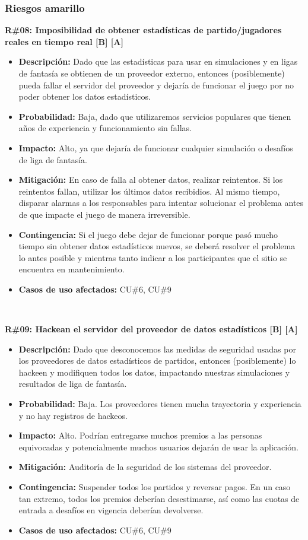 \subsubsection{Riesgos amarillo}

\noindent\textbf{R\#08: Imposibilidad de obtener estadísticas de partido/jugadores reales en tiempo real [B] [A] } 
\begin{itemize}
	\item{\textbf{Descripción:} Dado que las estadísticas para usar en simulaciones y en ligas de fantasía se obtienen de un proveedor externo, entonces (posiblemente) pueda fallar el servidor del proveedor y dejaría de funcionar el juego por no poder obtener los datos estadísticos.}
	\item{\textbf{Probabilidad:} Baja, dado que utilizaremos servicios populares que tienen años de experiencia y funcionamiento sin fallas.}
	\item{\textbf{Impacto:} Alto, ya que dejaría de funcionar cualquier simulación o desafíos de liga de fantasía.}
	\item{\textbf{Mitigación:} En caso de falla al obtener datos, realizar reintentos. Si los reintentos fallan, utilizar los últimos datos recibidios. Al mismo tiempo, disparar alarmas a los responsables para intentar solucionar el problema antes de que impacte el juego de manera irreversible.}
	\item{\textbf{Contingencia:} Si el juego debe dejar de funcionar porque pasó mucho tiempo sin obtener datos estadísticos nuevos, se deberá resolver el problema lo antes posible y mientras tanto indicar a los participantes que el sitio se encuentra en mantenimiento.}
	\item{\textbf{Casos de uso afectados:} CU\#6, CU\#9}
\end{itemize}

~

\noindent\textbf{R\#09: Hackean el servidor del proveedor de datos estadísticos [B] [A] } 
\begin{itemize}
	\item{\textbf{Descripción:} Dado que desconocemos las medidas de seguridad usadas por los proveedores de datos estadísticos de partidos, entonces (posiblemente) lo hackeen y modifiquen todos los datos, impactando nuestras simulaciones y resultados de liga de fantasía.}
	\item{\textbf{Probabilidad:} Baja. Los proveedores tienen mucha trayectoria y experiencia y no hay registros de hackeos.}
	\item{\textbf{Impacto:} Alto. Podrían entregarse muchos premios a las personas equivocadas y potencialmente muchos usuarios dejarán de usar la aplicación.}
	\item{\textbf{Mitigación:} Auditoría de la seguridad de los sistemas del proveedor.}
	\item{\textbf{Contingencia:} Suspender todos los partidos y reversar pagos. En un caso tan extremo, todos los premios deberían desestimarse, así como las cuotas de entrada a desafíos en vigencia deberían devolverse.}
	\item{\textbf{Casos de uso afectados:} CU\#6, CU\#9}
\end{itemize}

